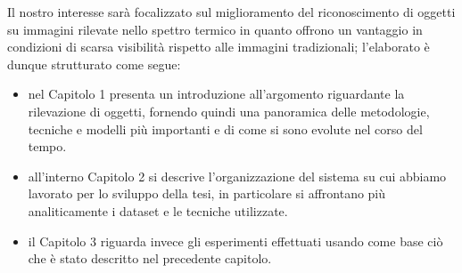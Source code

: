 Il nostro interesse sarà focalizzato sul miglioramento del riconoscimento di oggetti su immagini rilevate nello spettro termico in quanto offrono un vantaggio in condizioni di scarsa visibilità rispetto alle immagini tradizionali; l'elaborato è dunque strutturato come segue:
\begin{itemize}
    \item nel Capitolo 1 presenta un introduzione all'argomento riguardante la rilevazione di oggetti, fornendo quindi una panoramica delle metodologie, tecniche e modelli più importanti e di come si sono evolute nel corso del tempo. 
    \item all'interno Capitolo 2 si descrive l'organizzazione del sistema su cui abbiamo lavorato per lo sviluppo della tesi, in particolare si affrontano più analiticamente i dataset e le tecniche utilizzate. 
    \item il Capitolo 3 riguarda invece gli esperimenti effettuati usando come base ciò che è stato descritto nel precedente capitolo. 
\end{itemize}

